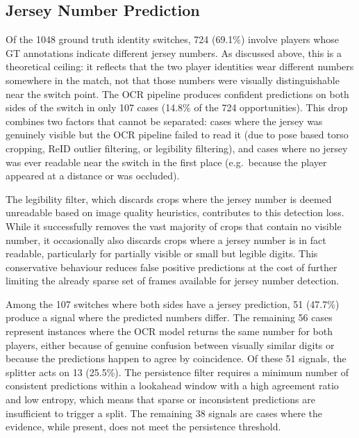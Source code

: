 \subsection{Jersey Number Prediction}\label{subsec:jersey-prediction-quality}

Of the 1048 ground truth identity switches, 724 (69.1\%) involve players whose GT annotations indicate different jersey numbers. As discussed above, this is a theoretical ceiling: it reflects that the two player identities wear different numbers somewhere in the match, not that those numbers were visually distinguishable near the switch point. The OCR pipeline produces confident predictions on both sides of the switch in only 107 cases (14.8\% of the 724 opportunities). This drop combines two factors that cannot be separated: cases where the jersey was genuinely visible but the OCR pipeline failed to read it (due to pose based torso cropping, ReID outlier filtering, or legibility filtering), and cases where no jersey was ever readable near the switch in the first place (e.g.\ because the player appeared at a distance or was occluded).

The legibility filter, which discards crops where the jersey number is deemed unreadable based on image quality heuristics, contributes to this detection loss. While it successfully removes the vast majority of crops that contain no visible number, it occasionally also discards crops where a jersey number is in fact readable, particularly for partially visible or small but legible digits. This conservative behaviour reduces false positive predictions at the cost of further limiting the already sparse set of frames available for jersey number detection.

Among the 107 switches where both sides have a jersey prediction, 51 (47.7\%) produce a signal where the predicted numbers differ. The remaining 56 cases represent instances where the OCR model returns the same number for both players, either because of genuine confusion between visually similar digits or because the predictions happen to agree by coincidence. Of these 51 signals, the splitter acts on 13 (25.5\%). The persistence filter requires a minimum number of consistent predictions within a lookahead window with a high agreement ratio and low entropy, which means that sparse or inconsistent predictions are insufficient to trigger a split. The remaining 38 signals are cases where the evidence, while present, does not meet the persistence threshold.

